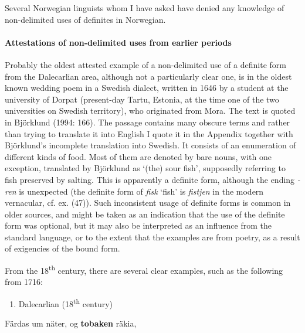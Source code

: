 Several Norwegian linguists whom I have asked have denied any knowledge of non-delimited uses of definites in Norwegian. 

\paragraph[Attestations of non{}-delimited uses from earlier periods]{\rmfamily Attestations of non-delimited uses from earlier periods}
\label{bkm:Ref154983425}%
Probably the oldest attested example of a non-delimited use of a definite form from the Dalecarlian area, although not a particularly clear one, is in the oldest known wedding poem in a Swedish dialect, written in 1646 by a student at the university of Dorpat (present-day Tartu, Estonia, at the time one of the two universities on Swedish territory), who originated from Mora. The text is quoted in Björklund (1994: 166). The passage contains many obscure terms and rather than trying to translate it into English I quote it in the Appendix together with Björklund’s incomplete translation into Swedish. It consists of an enumeration of different kinds of food. Most of them are denoted by bare nouns, with one exception, translated by Björklund as  ‘(the) sour fish’, supposedly referring to fish preserved by salting. This is apparently a definite form, although the ending \textit{{}-ren} is unexpected (the definite form of \textit{fisk} ‘fish’ is \textit{fistjen} in the modern vernacular, cf. ex. (47)). Such inconsistent usage of definite forms is common in older sources, and might be taken as an indication that the use of the definite form was optional, but it may also be interpreted as an influence from the standard language, or to the extent that the examples are from poetry, as a result of exigencies of the bound form. 

From the 18\textsuperscript{th} century, there are several clear examples, such as the following from 1716:

\begin{enumerate} %
\item 
Dalecarlian (18\textsuperscript{th} century)
\end{enumerate} %
\ea\label{}
\gll Färdas  um  näter,  og  \textbf{tobaken} räkia,\\


